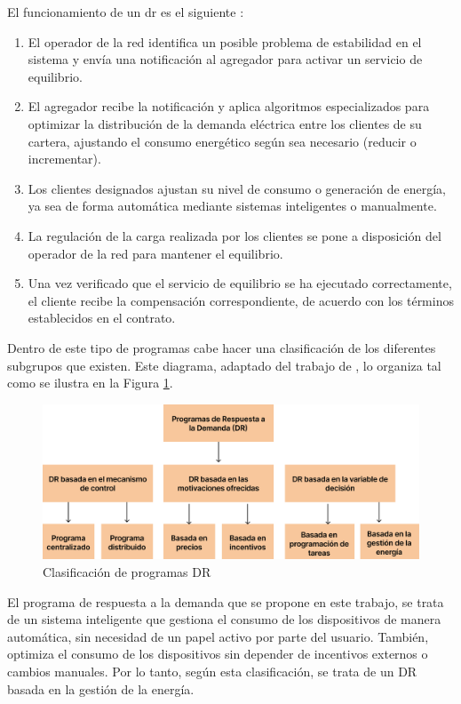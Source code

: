 \documentclass[11pt,a4paper]{book}
\begin{document}
El funcionamiento de un \gls{dr} es el siguiente \cite{demandresponse2025}:
\begin{enumerate}
    \item El operador de la red identifica un posible problema de estabilidad en el sistema y envía una notificación al agregador para activar un servicio de equilibrio.
    \item El agregador recibe la notificación y aplica algoritmos especializados para optimizar la distribución de la demanda eléctrica entre los clientes de su cartera, ajustando el consumo energético según sea necesario (reducir o incrementar).
    \item Los clientes designados ajustan su nivel de consumo o generación de \mbox{energía}, ya sea de forma automática mediante sistemas inteligentes o \mbox{manualmente}.
    \item La regulación de la carga realizada por los clientes se pone a disposición del operador de la red para mantener el equilibrio.
    \item Una vez verificado que el servicio de equilibrio se ha ejecutado correctamente, el cliente recibe la compensación correspondiente, de acuerdo con los términos establecidos en el contrato.
\end{enumerate}

Dentro de este tipo de programas cabe hacer una clasificación de los diferentes subgrupos que existen. Este diagrama, adaptado del trabajo de \cite{renewableRevolution2024}, lo organiza tal como se ilustra en la Figura \ref{fig:programa-dr}.

\begin{figure}
    \centering
    \includegraphics[width=1\linewidth]{fig/diagrama_DR.png}
    \caption{Clasificación de programas DR}
    \label{fig:programa-dr}
\end{figure}

El programa de respuesta a la demanda que se propone en este trabajo, se trata de un sistema inteligente que gestiona el consumo de los dispositivos de manera automática, sin necesidad de un papel activo por parte del usuario. También, optimiza el consumo de los dispositivos sin depender de incentivos externos o cambios manuales. Por lo tanto, según esta clasificación, se trata de un DR basada en la gestión de la energía.
\end{document}
